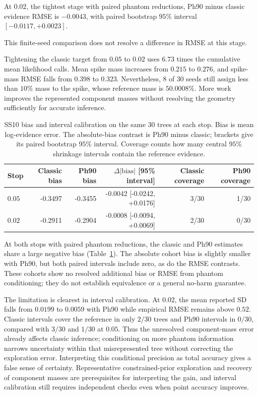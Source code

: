 \documentclass[pdflatex,sn-basic,icol]{sn-jnl}
\theoremstyle{plain}
\theoremstyle{definition}
\begin{document}
At $0.02$, the tightest stage with paired phantom reductions, Ph90 minus classic evidence RMSE is $-0.0043$, with paired bootstrap $95\%$ interval $[-0.0117,+0.0023]$.

This finite-seed comparison does not resolve a difference in RMSE at this stage.

Tightening the classic target from $0.05$ to $0.02$ uses $6.73$ times the cumulative mean likelihood calls. Mean spike mass increases from $0.215$ to $0.276$, and spike-mass RMSE falls from $0.398$ to $0.323$. Nevertheless, $8$ of $30$ seeds still assign less than $10\%$ mass to the spike, whose reference mass is $50.0008\%$. More work improves the represented component masses without resolving the geometry sufficiently for accurate inference.


\begin{table}[t]
\centering
\scriptsize
\caption{SS10 bias and interval calibration on the same 30 trees at each stop.
Bias is mean log-evidence error. The absolute-bias contrast is Ph90 minus classic;
brackets give its paired bootstrap $95\%$ interval. Coverage counts how many
central $95\%$ shrinkage intervals contain the reference evidence.}
\label{tab:ss10_bias_coverage}
\begin{tabular}{lrrrrr}
\toprule
Stop & Classic bias & Ph90 bias & $\Delta|\mathrm{bias}|$ [95\% interval]
& Classic coverage & Ph90 coverage\\
\midrule

$0.05$ & -0.3497 & -0.3455 & -0.0042 [-0.0242, +0.0176] & 3/30 & 1/30 \\

$0.02$ & -0.2911 & -0.2904 & -0.0008 [-0.0094, +0.0069] & 2/30 & 0/30 \\

\bottomrule
\end{tabular}
\end{table}


At both stops with paired phantom reductions, the classic and Ph90 estimates share a large negative
bias (Table~\ref{tab:ss10_bias_coverage}). The absolute cohort bias is slightly
smaller with Ph90, but both paired intervals include zero, as do the RMSE
contrasts. These cohorts show no resolved additional bias or RMSE from phantom
conditioning; they do not establish equivalence or a general no-harm guarantee.

The limitation is clearest in interval calibration. At $0.02$, the mean
reported SD falls from $0.0199$ to $0.0059$ with Ph90 while empirical RMSE
remains above $0.52$. Classic intervals cover the reference in only $2/30$
trees and Ph90 intervals in $0/30$, compared with $3/30$ and $1/30$ at $0.05$.
Thus the unresolved component-mass error already affects classic inference;
conditioning on more phantom information narrows uncertainty within that
misrepresented tree without correcting the exploration error. Interpreting
this conditional precision as total accuracy gives a false sense of certainty.
Representative constrained-prior exploration and recovery of component masses
are prerequisites for interpreting the gain, and interval calibration still
requires independent checks even when point accuracy improves.
\end{document}
